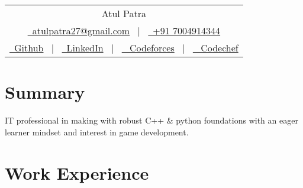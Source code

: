 \documentclass[a4paper,10pt]{article}
\begin{document}
\pagestyle{empty} 



\begin{tabularx}{\linewidth}{@{} C @{}}
\Huge{Atul Patra} \\[7.5pt]
\href{mailto:atulpatra27@gmail.com}{\raisebox{-0.05\height} \ atulpatra27@gmail.com} \ $|$ \ 
\href{tel:+91 7004914344}{\raisebox{-0.05\height}\ +91 7004914344} \\


\href{https://github.com/flxcsx}{\raisebox{-0.05\height}\ Github} \ $|$ \ 
\href{https://www.linkedin.com/in/altxt/}{\raisebox{-0.05\height}\ LinkedIn} \ $|$ \ 
\href{https://codeforces.com/profile/altxt}{\raisebox{-0.05\height} \ Codeforces} \ $|$ \ 
\href{https://codechef.com/user/altxt}{\raisebox{-0.05\height} \ Codechef} 
\end{tabularx}


\section{Summary}
IT professional in making with robust C++ \& python foundations with an eager learner mindset and interest in game development.

\section{Work Experience}
\end{document}
